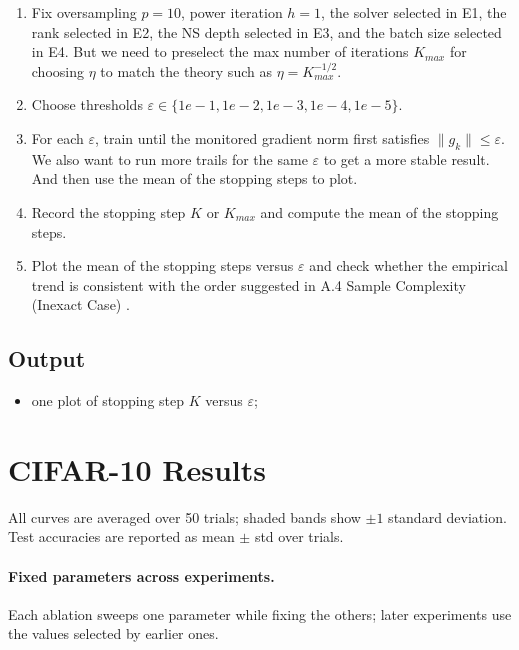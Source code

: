 \documentclass[11pt]{article}
\begin{document}
\begin{enumerate}[nosep]
\item Fix oversampling $p=10$, power iteration $h=1$, the solver selected in E1, the rank selected in E2, the NS depth selected in E3, and the batch size selected in E4. But we need to preselect the max number of iterations $K_{max}$ for choosing $\eta$ to match the theory such as $\eta = K_{max}^{-1/2}$.
\item Choose thresholds $\varepsilon \in \{1e-1, 1e-2, 1e-3, 1e-4, 1e-5\}$.
\item For each $\varepsilon$, train until the monitored gradient norm first satisfies $\|g_k\| \leq \varepsilon$. We also want to run more trails for the same $\varepsilon$ to get a more stable result. And then use the mean of the stopping steps to plot.
\item Record the stopping step $K$ or $K_{max}$ and compute the mean of the stopping steps.
\item Plot the mean of the stopping steps versus $\varepsilon$ and check whether the empirical trend is consistent with the order suggested in A.4 Sample Complexity (Inexact Case) .
\end{enumerate}

\subsection{Output}

\begin{itemize}[nosep]
\item one plot of stopping step $K$ versus $\varepsilon$;
\end{itemize}


\section{CIFAR-10 Results}

All curves are averaged over 50 trials; shaded bands show $\pm 1$ standard deviation. Test accuracies are reported as mean $\pm$ std over trials.

\paragraph{Fixed parameters across experiments.} Each ablation sweeps one parameter while fixing the others; later experiments use the values selected by earlier ones.
\end{document}
